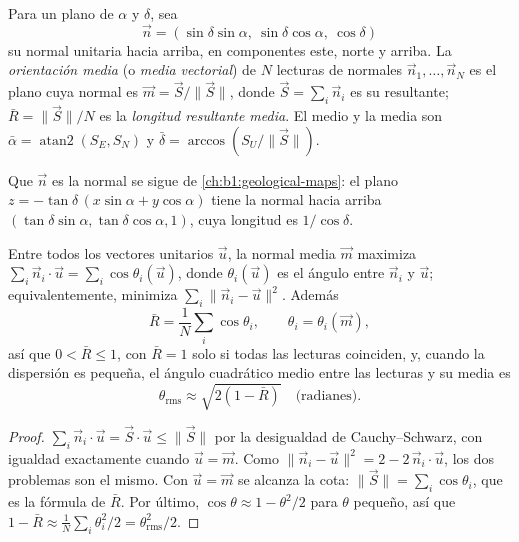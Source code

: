 \begin{definition}\label{def:b1:field-lab-methods-1:mean-orientation}
Para un plano de  $\alpha$ y  $\delta$, sea
\[
  \vec n = (\sin\delta\sin\alpha,\ \sin\delta\cos\alpha,\ \cos\delta)
\]
su normal unitaria hacia arriba, en componentes este, norte y arriba. La \emph{orientación media}
(o \emph{media vectorial}) de $N$ lecturas de normales $\vec n_1, \dots, \vec n_N$ es el plano cuya normal es
$\vec m = \vec S/\|\vec S\|$, donde $\vec S = \sum_i \vec n_i$ es su resultante; $\bar R = \|\vec S\|/N$ es la
\emph{longitud resultante media}. El  medio y la  media son
$\bar\alpha = \operatorname{atan2}(S_E, S_N)$ y $\bar\delta = \arccos(S_U/\|\vec S\|)$.
\end{definition}

Que $\vec n$ es la normal se sigue de \cref{ch:b1:geological-maps}: el plano
$z = -\tan\delta\,(x\sin\alpha + y\cos\alpha)$ tiene la normal hacia arriba
$(\tan\delta\sin\alpha, \tan\delta\cos\alpha, 1)$, cuya longitud es $1/\cos\delta$.

\begin{proposition}\label{prop:b1:field-lab-methods-1:vector-mean}
Entre todos los vectores unitarios $\vec u$, la normal media $\vec m$ maximiza
$\sum_i \vec n_i\cdot\vec u = \sum_i \cos\theta_i(\vec u)$, donde
$\theta_i(\vec u)$ es el ángulo entre $\vec n_i$ y $\vec u$; equivalentemente,
minimiza $\sum_i \|\vec n_i - \vec u\|^2$. Además
\[
  \bar R = \frac1N\sum_i \cos\theta_i, \qquad \theta_i = \theta_i(\vec m),
\]
así que $0 < \bar R \le 1$, con $\bar R = 1$ solo si todas las lecturas coinciden, y, cuando la dispersión
es pequeña, el ángulo cuadrático medio entre las lecturas y su media es
\[
  \theta_{\text{rms}} \approx \sqrt{2(1 - \bar R)} \quad\text{(radianes)}.
\]
\end{proposition}

\begin{proof}
$\sum_i \vec n_i\cdot\vec u = \vec S\cdot\vec u \le \|\vec S\|$ por la desigualdad de Cauchy--Schwarz,
con igualdad exactamente cuando $\vec u = \vec m$. Como $\|\vec n_i - \vec u\|^2 = 2 - 2\,\vec n_i\cdot\vec u$,
los dos problemas son el mismo. Con $\vec u = \vec m$ se alcanza la cota:
$\|\vec S\| = \sum_i\cos\theta_i$, que es la fórmula de $\bar R$. Por último, $\cos\theta \approx 1 - \theta^2/2$
para $\theta$ pequeño, así que $1 - \bar R \approx
\frac1N\sum_i\theta_i^2/2 = \theta_{\text{rms}}^2/2$.
\end{proof}

